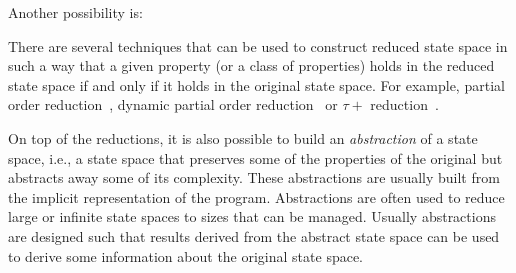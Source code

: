\begin{definition}
{Another possibility is:\\
}
\end{definition}

There are several techniques that can be used to construct reduced state space in such a way that a given property (or a class of properties) holds in the reduced state space if and only if it holds in the original state space.
For example, partial order reduction~\cite{Peled1993}, dynamic partial order reduction~\cite{Flanagan2005dpor} or $\tau+$ reduction~\cite{RBB13}.


On top of the reductions, it is also possible to build an \emph{abstraction} of a state space, i.e., a state space that preserves some of the properties of the original but abstracts away some of its complexity.
These abstractions are usually built from the implicit representation of the program.
Abstractions are often used to reduce large or infinite state spaces to sizes that can be managed.
Usually abstractions are designed such that results derived from the abstract state space can be used to derive some information about the original state space.

